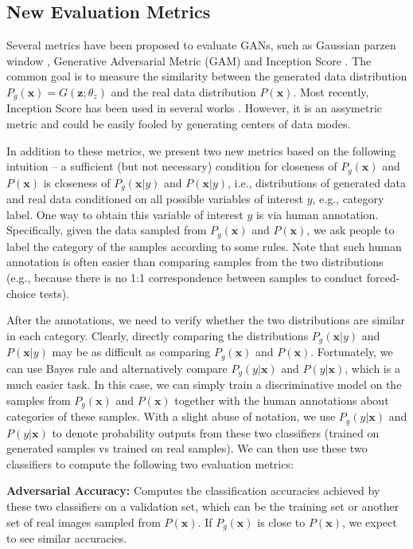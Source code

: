 \documentclass{article} \usepackage{iclr2017_conference,times}
\begin{document}
\subsection{New Evaluation Metrics}
\vspace{-5pt}
Several metrics have been proposed to evaluate GANs, such as Gaussian parzen window \citep{GAN}, Generative Adversarial Metric (GAM) \citep{GRAN} and Inception Score \citep{ImprovedGAN}. The common goal is to measure the similarity between the generated data distribution $P_g(\bm{x}) = G(\bm{z}; \theta_z)$ and the real data distribution $P(\bm{x})$.  Most recently, Inception Score has been used in several works \citep{ImprovedGAN, EBGAN}. However, it is an assymetric metric and could be easily fooled by generating centers of data modes.

In addition to these metrics, we present two new metrics based on the following intuition -- a sufficient (but not necessary) condition for closeness of $P_g(\bm{x})$ and $P(\bm{x})$ is closeness of $P_g(\bm{x}|y)$ and $P(\bm{x}|y)$, i.e., distributions of generated data and real data conditioned on all possible variables of interest $y$, e.g., category label. One way to obtain this variable of interest $y$ is via human annotation. Specifically, given the data sampled from $P_g(\bm{x})$ and $P(\bm{x})$, we ask people to label the category of the samples according to some rules. Note that such human annotation is often easier than comparing samples from the two distributions (e.g., because there is no 1:1 correspondence between samples to conduct forced-choice tests). 

After the annotations, we need to verify whether the two distributions are similar in each category. Clearly, directly comparing the distributions $P_g(\bm{x}|y)$ and $P(\bm{x}|y)$ may be as difficult as comparing $P_g(\bm{x})$ and $P(\bm{x})$. Fortunately, we can use Bayes rule and alternatively compare $P_g(y|\bm{x})$ and $P(y|\bm{x})$, which is a much easier task. In this case, we can simply train a discriminative model on the samples from $P_g(\bm{x})$ and $P(\bm{x})$ together with the human annotations about categories of these samples. With a slight abuse of notation, we use $P_g(y|\bm{x})$ and $P(y|\bm{x})$ to denote probability outputs from these two classifiers (trained on generated samples vs trained on real samples). We can then use these two classifiers to compute the following two evaluation metrics: 

\textbf{Adversarial Accuracy:} Computes the classification accuracies achieved by these two classifiers on a validation set, which can be the training set or another set of real images sampled from $P(\bm{x})$. If $P_g(\bm{x})$ is close to $P(\bm{x})$, we expect to see similar accuracies.
\end{document}
